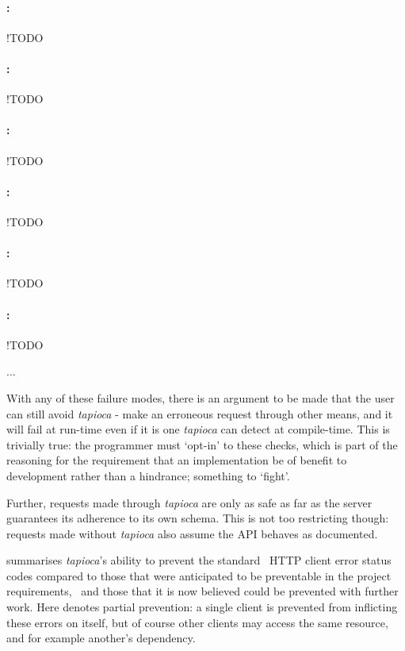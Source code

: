 \paragraph{:} !TODO
\paragraph{:} !TODO
\paragraph{:} !TODO
\paragraph{:} !TODO
\paragraph{:} !TODO
\paragraph{:} !TODO

...

With any of these failure modes, there is an argument to be made that the user can still avoid \emph{tapioca} - make an erroneous request through other means, and it will fail at run-time even if it is one \emph{tapioca} can detect at compile-time. This is trivially true: the programmer must `opt-in' to these checks, which is part of the reasoning for the requirement that an implementation be of benefit to development rather than a hindrance; something to `fight'.

Further, requests made through \emph{tapioca} are only as safe as far as the server guarantees its adherence to its own schema. This is not too restricting though: requests made without \emph{tapioca} also assume the API behaves as documented.

 summarises \emph{tapioca}'s ability to prevent the standard~\cite{rfc7231} HTTP client error status codes compared to those that were anticipated to be preventable in the project requirements,~ and those that it is now believed could be prevented with further work. Here \hmark\; denotes partial prevention: a single client is prevented from inflicting these errors on itself, but of course other clients may access the same resource, and for example  another's dependency.

